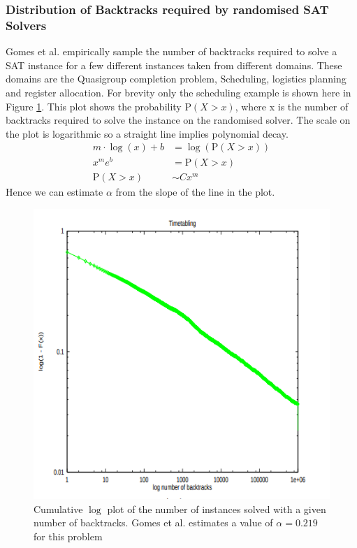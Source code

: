 \subsubsection{Distribution of Backtracks required by randomised SAT Solvers}
Gomes et al. empirically sample the number of backtracks required to solve a SAT instance for a
few different instances taken from different domains. These domains are the Quasigroup completion problem,
Scheduling, logistics planning and register allocation. For brevity only the scheduling example is shown here
in Figure \ref{fig:scheduling}. This plot shows the probability $\text{P}(X > x)$, where x is the number of backtracks required
to solve the instance on the randomised solver. The scale on the plot is logarithmic so a straight line
implies polynomial decay.
\begin{align*}
    m \cdot \log(x) + b &= \log(\text{P}(X > x))\\
    x^{m} e^{b} &= \text{P}(X > x)\\
    \text{P}(X > x) &\sim Cx^{m}
\end{align*}
Hence we can estimate $\alpha$ from the slope of the line in the plot.

\begin{figure}
    \centering
    \includegraphics[scale=0.35]{scheduling_tails.png}
    \caption[Distribution of number of backtracks]{Cumulative $\log$ plot of the number of instances solved with a given number of backtracks. Gomes et al. estimates a value of $\alpha = 0.219$ for this problem}
    \label{fig:scheduling}
\end{figure}

